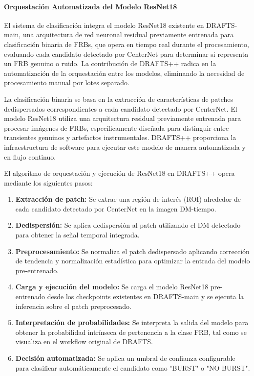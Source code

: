 \paragraph{Orquestación Automatizada del Modelo ResNet18}

El sistema de clasificación integra el modelo ResNet18 existente en DRAFTS-main, una arquitectura de red neuronal residual previamente entrenada para clasificación binaria de FRBs, que opera en tiempo real durante el procesamiento, evaluando cada candidato detectado por CenterNet para determinar si representa un FRB genuino o ruido. La contribución de DRAFTS++ radica en la automatización de la orquestación entre los modelos, eliminando la necesidad de procesamiento manual por lotes separado.

La clasificación binaria se basa en la extracción de características de patches dedispersados correspondientes a cada candidato detectado por CenterNet. El modelo ResNet18 utiliza una arquitectura residual previamente entrenada para procesar imágenes de FRBs, específicamente diseñada para distinguir entre transientes genuinos y artefactos instrumentales. DRAFTS++ proporciona la infraestructura de software para ejecutar este modelo de manera automatizada y en flujo continuo.

El algoritmo de orquestación y ejecución de ResNet18 en DRAFTS++ opera mediante los siguientes pasos:

\begin{enumerate}
    \item \textbf{Extracción de patch:} Se extrae una región de interés (ROI) alrededor de cada candidato detectado por CenterNet en la imagen DM-tiempo.
    \item \textbf{Dedispersión:} Se aplica dedispersión al patch utilizando el DM detectado para obtener la señal temporal integrada.
    \item \textbf{Preprocesamiento:} Se normaliza el patch dedispersado aplicando corrección de tendencia y normalización estadística para optimizar la entrada del modelo pre-entrenado.
    \item \textbf{Carga y ejecución del modelo:} Se carga el modelo ResNet18 pre-entrenado desde los checkpoints existentes en DRAFTS-main y se ejecuta la inferencia sobre el patch preprocesado.
    \item \textbf{Interpretación de probabilidades:} Se interpreta la salida del modelo para obtener la probabilidad intrínseca de pertenencia a la clase FRB, tal como se visualiza en el workflow original de DRAFTS.
    \item \textbf{Decisión automatizada:} Se aplica un umbral de confianza configurable para clasificar automáticamente el candidato como "BURST" o "NO BURST".
\end{enumerate}

